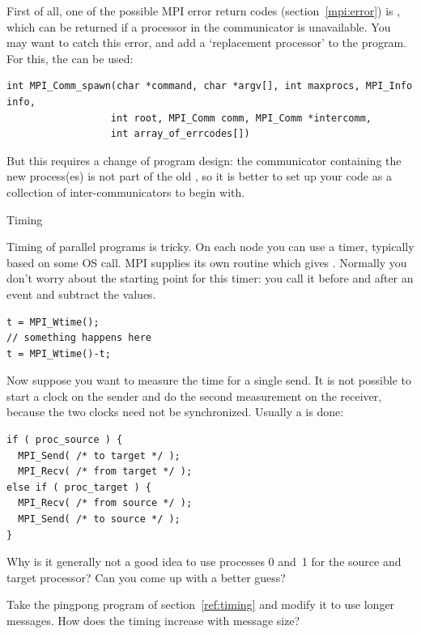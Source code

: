 First of all, one of the possible MPI error return codes
(section~\ref{mpi:error}) is , which can be returned
if a processor in the communicator is unavailable. You may want to
catch this error, and add a `replacement processor' to the
program. For this, the  can be used:
\begin{verbatim}
int MPI_Comm_spawn(char *command, char *argv[], int maxprocs, MPI_Info info, 
                  int root, MPI_Comm comm, MPI_Comm *intercomm,
                  int array_of_errcodes[])
\end{verbatim}
But this requires a change of program design: the communicator
containing the new process(es) is not part of the
old , so it is better to set up your code as a
collection of inter-communicators to begin with.

 {Timing}

Timing of parallel programs is tricky. On each node you can use a timer,
typically based on some \ac{OS} call. MPI supplies its own routine
 which gives .
Normally you don't worry about the starting point for this timer: 
you call it before and after an event and subtract the values.
\begin{verbatim}
t = MPI_Wtime();
// something happens here
t = MPI_Wtime()-t;
\end{verbatim}

Now suppose you want to measure the time for a single send. It is not possible
to start a clock on the sender and do the second measurement on the receiver,
because the two clocks need not be synchronized. Usually a  is 
done: 
\begin{verbatim}
if ( proc_source ) {
  MPI_Send( /* to target */ );
  MPI_Recv( /* from target */ );
else if ( proc_target ) {
  MPI_Recv( /* from source */ );
  MPI_Send( /* to source */ );
}
\end{verbatim}

\begin{exercise}
  Why is it generally not a good idea to use processes 0 and~1 for the source and target processor?
  Can you come up with a better guess?
\end{exercise}

\begin{exercise}
  Take the pingpong program of section~\ref{ref:timing} and modify it 
  to use longer messages. How does the timing increase with message size?
\end{exercise}

